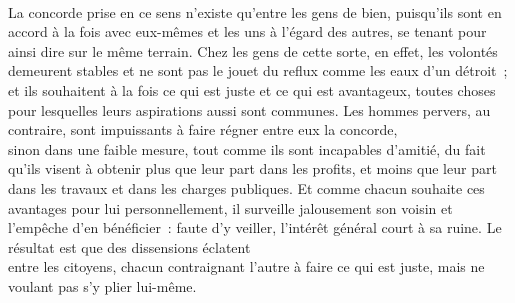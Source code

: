 \documentclass[french,twoside]{book} %
\begin{document}
\\
La concorde prise en ce sens n’existe qu’entre les gens de bien, puisqu’ils sont en accord à la fois avec eux-mêmes et les uns à l’égard des autres, se tenant pour ainsi dire sur le même terrain. Chez les gens de cette sorte, en effet, les volontés demeurent stables et ne sont pas le jouet du reflux comme les eaux d’un détroit ; et ils souhaitent à la fois ce qui est juste et ce qui est avantageux, toutes choses pour lesquelles leurs aspirations aussi sont communes. Les hommes pervers, au contraire, sont impuissants à faire régner entre eux la concorde, \\
sinon dans une faible mesure, tout comme ils sont incapables d’amitié, du fait qu’ils visent à obtenir plus que leur part dans les profits, et moins que leur part dans les travaux et dans les charges publiques. Et comme chacun souhaite ces avantages pour lui personnellement, il surveille jalousement son voisin et l’empêche d’en bénéficier : faute d’y veiller, l’intérêt général court à sa ruine. Le résultat est que des dissensions éclatent \\
entre les citoyens, chacun contraignant l’autre à faire ce qui est juste, mais ne voulant pas s’y plier lui-même.
\end{document}

